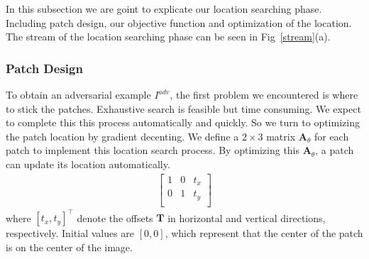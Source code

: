 \documentclass[10pt,twocolumn,letterpaper]{article}
\begin{document}
In this subsection we are goint to 
explicate our location searching phase.
Including patch design, our objective function
and optimization of the location.
The stream of the location searching phase can be seen in 
Fig~\ref{stream}(a). 
\subsubsection{Patch Design}
\label{Patch Design}
To obtain an adversarial example $I^{adv}$,
the first problem we encountered is where to stick the patches.
Exhaustive search is feasible but time consuming. We expect to
complete this this process automatically and quickly.
So we turn to optimizing the patch location 
by gradient decenting.  
We define a $2 \times 3$ matrix 
$\mathbf{A}_\theta$ for each patch to implement this 
location search process.
By optimizing this $\mathbf{A}_\theta$, a patch can update its 
location automatically.
\begin{align}
	\left[
		\begin{array}{ccc}
			1 & 0 & t_x \\
			0 & 1 & t_y \\
		\end{array}
		\right]      
\end{align}
where $[t_x,t_y]^\top$ denote the offsets $\textbf{T}$ in 
horizontal and vertical directions, respectively. 
Initial values are $[0,0]$, which represent
that the center of the patch is on the center of the image.
\end{document}
